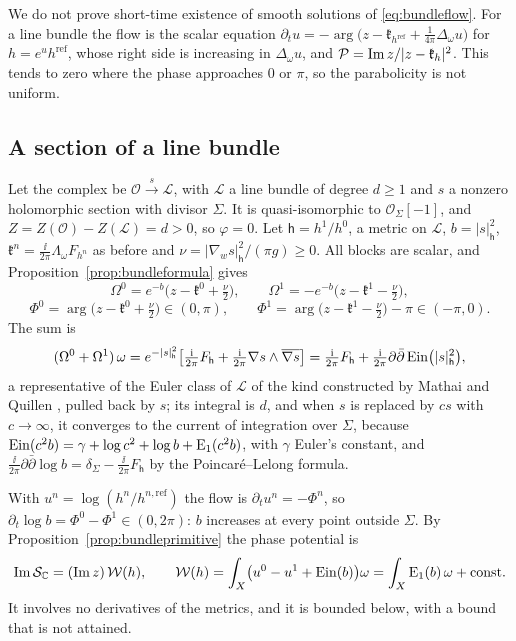 We do not prove short-time existence of smooth solutions of
\eqref{eq:bundleflow}. For a line bundle the flow
is the scalar equation
$\partial_tu=-\arg\bigl(z-\mathfrak k_{h^{\mathrm{ref}}}+\frac1{4\pi}\Delta_\omega u\bigr)$
for $h=e^uh^{\mathrm{ref}}$, whose right side is increasing in
$\Delta_\omega u$, and $\mathcal P=\operatorname{Im} z/|z-\mathfrak k_h|^2$. This tends to
zero where the phase approaches $0$ or $\pi$, so the parabolicity is not
uniform.

\subsection{A section of a line bundle}
Let the complex be $\mathcal O\xrightarrow{s}\mathcal L$, with $\mathcal L$ a
line bundle of degree $d\geq1$ and $s$ a nonzero holomorphic section with
divisor $\Sigma$. It is quasi-isomorphic to $\mathcal O_\Sigma[-1]$, and
$Z=Z(\mathcal O)-Z(\mathcal L)=d>0$, so $\varphi=0$. Let
$\mathsf h=h^1/h^0$, a metric on $\mathcal L$, $b=|s|^2_{\mathsf h}$,
$\mathfrak k^n=\frac{\ii}{2\pi}\Lambda_\omega F_{h^n}$ as before and
$\nu=|\nabla_ws|^2_{\mathsf h}/(\pi g)\geq0$. All blocks are scalar, and
Proposition~\ref{prop:bundleformula} gives
\[
 \Omega^0=e^{-b}\bigl(z-\mathfrak k^0+\tfrac\nu2\bigr),\qquad
 \Omega^1=-e^{-b}\bigl(z-\mathfrak k^1-\tfrac\nu2\bigr),
\]
\[
 \Phi^0=\arg\bigl(z-\mathfrak k^0+\tfrac\nu2\bigr)\in(0,\pi),\qquad
 \Phi^1=\arg\bigl(z-\mathfrak k^1-\tfrac\nu2\bigr)-\pi\in(-\pi,0).
\]
The sum is
\[
 (\Omega^0+\Omega^1)\,\omega=e^{-|s|^2_{\mathsf h}}\bigl[\tfrac{\mathrm i}{2\pi}F_{\mathsf h}
 +\tfrac{\mathrm i}{2\pi}\nabla s\wedge\overline{\nabla s}\bigr]
 =\tfrac{\mathrm i}{2\pi}F_{\mathsf h}+\tfrac{\mathrm i}{2\pi}\partial\bar\partial\operatorname{Ein}\bigl(|s|^2_{\mathsf h}\bigr),
\]
a representative of the Euler class of $\mathcal L$ of the kind constructed
by Mathai and Quillen \cite{mq86}, pulled back by $s$; its integral is $d$,
and when $s$ is replaced by $cs$ with $c\to\infty$, it converges to the
current of integration over $\Sigma$, because
$\operatorname{Ein}(c^2b)=\gamma+\log c^2+\log b+\mathrm E_1(c^2b)$, with $\gamma$ Euler's
constant, and $\frac{\ii}{2\pi}\partial\bar\partial\log b=\delta_\Sigma-\frac{\ii}{2\pi}F_{\mathsf h}$
by the Poincar\'e--Lelong formula.

With $u^n=\log(h^n/h^{n,\mathrm{ref}})$ the flow is $\partial_tu^n=-\Phi^n$,
so $\partial_t\log b=\Phi^0-\Phi^1\in(0,2\pi)$: $b$ increases at every point
outside $\Sigma$. By Proposition~\ref{prop:bundleprimitive} the phase
potential is
\[
 \operatorname{Im}\mathcal S_{\mathbb C}=(\operatorname{Im} z)\,\mathcal W(h),\qquad
 \mathcal W(h)=\int_X\bigl(u^0-u^1+\operatorname{Ein}(b)\bigr)\omega
 =\int_X\mathrm E_1(b)\,\omega+\mathrm{const}.
\]
It involves no derivatives of the metrics, and it is bounded below, with a
bound that is not attained.

